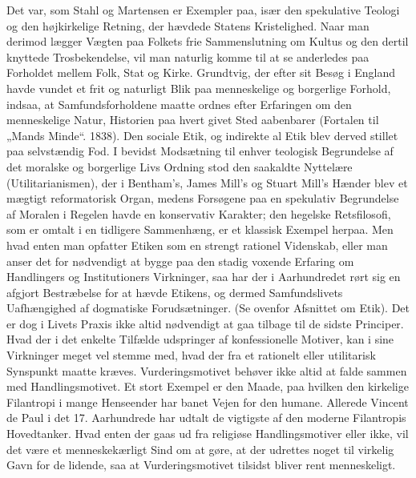 \documentclass[12pt,a4paper,openany]{book}
\newcommand{\opage}[1]{\marginnote{\footnotesize\textit{[#1]}}}
\begin{document}
Det var, som Stahl og Martensen er Exempler paa, især den spekulative
Teologi og den højkirkelige Retning, der hævdede Statens
Kristelighed. Naar man derimod lægger Vægten paa Folkets frie
Sammenslutning om Kultus og den dertil knyttede Trosbekendelse,
vil man naturlig komme til at se anderledes paa Forholdet mellem
Folk, Stat og Kirke. Grundtvig, der efter sit Besøg i England havde
vundet et frit og naturligt Blik paa menneskelige og borgerlige Forhold,
indsaa, at Samfundsforholdene maatte ordnes efter Erfaringen
om den menneskelige Natur, Historien paa hvert givet Sted aabenbarer
(Fortalen til „Mands Minde“. 1838). Den sociale Etik, og indirekte
al Etik blev derved stillet paa selvstændig Fod.
I bevidst Modsætning til enhver teologisk Begrundelse af det moralske
og borgerlige Livs Ordning stod den saakaldte Nyttelære (Utilitarianismen),
der i Bentham’s, James Mill’s og Stuart Mill’s Hænder
blev et mægtigt reformatorisk Organ, medens Forsøgene paa en
spekulativ Begrundelse af Moralen i Regelen havde en konservativ
Karakter; den hegelske Retsfilosofi, som er omtalt i en tidligere
Sammenhæng, er et klassisk Exempel herpaa. Men hvad enten man
opfatter Etiken som en strengt rationel Videnskab, eller man anser
det for nødvendigt at bygge paa den stadig voxende Erfaring om
Handlingers og Institutioners Virkninger, saa har der i Aarhundredet
rørt sig en afgjort Bestræbelse for at hævde Etikens, og dermed
\opage{144}Samfundslivets Uafhængighed af dogmatiske Forudsætninger. (Se
ovenfor Afsnittet om Etik). Det er dog i Livets Praxis ikke altid nødvendigt
at gaa tilbage til de sidste Principer. Hvad der i det enkelte
Tilfælde udspringer af konfessionelle Motiver, kan i sine Virkninger
meget vel stemme med, hvad der fra et rationelt eller utilitarisk
Synspunkt maatte kræves. Vurderingsmotivet behøver ikke altid at
falde sammen med Handlingsmotivet. Et stort Exempel er den
Maade, paa hvilken den kirkelige Filantropi i mange Henseender
har banet Vejen for den humane. Allerede Vincent de Paul i det
17. Aarhundrede har udtalt de vigtigste af den moderne Filantropis
Hovedtanker. Hvad enten der gaas ud fra religiøse Handlingsmotiver
eller ikke, vil det være et menneskekærligt Sind om at gøre, at der
udrettes noget til virkelig Gavn for de lidende, saa at Vurderingsmotivet
tilsidst bliver rent menneskeligt.
\end{document}
